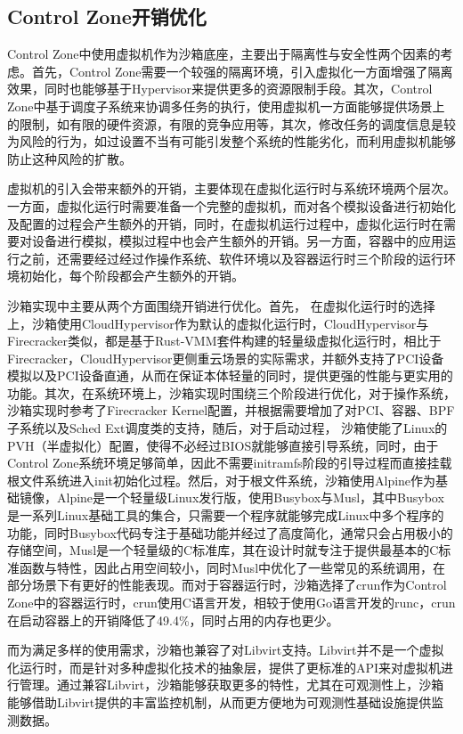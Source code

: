 \subsection{Control Zone开销优化}

Control Zone中使用虚拟机作为沙箱底座，主要出于隔离性与安全性两个因素的考虑。首先，Control Zone需要一个较强的隔离环境，引入虚拟化一方面增强了隔离效果，同时也能够基于Hypervisor来提供更多的资源限制手段。其次，Control Zone中基于调度子系统来协调多任务的执行，使用虚拟机一方面能够提供场景上的限制，如有限的硬件资源，有限的竞争应用等，其次，修改任务的调度信息是较为风险的行为，如过设置不当有可能引发整个系统的性能劣化，而利用虚拟机能够防止这种风险的扩散。

虚拟机的引入会带来额外的开销，主要体现在虚拟化运行时与系统环境两个层次。一方面，虚拟化运行时需要准备一个完整的虚拟机，而对各个模拟设备进行初始化及配置的过程会产生额外的开销，同时，在虚拟机运行过程中，虚拟化运行时在需要对设备进行模拟，模拟过程中也会产生额外的开销。另一方面，容器中的应用运行之前，还需要经过经过作操作系统、软件环境以及容器运行时三个阶段的运行环境初始化，每个阶段都会产生额外的开销。

沙箱实现中主要从两个方面围绕开销进行优化。首先， 在虚拟化运行时的选择上，沙箱使用CloudHypervisor作为默认的虚拟化运行时，CloudHypervisor与Firecracker类似，都是基于Rust-VMM套件构建的轻量级虚拟化运行时，相比于Firecracker，CloudHypervisor更侧重云场景的实际需求，并额外支持了PCI设备模拟以及PCI设备直通，从而在保证本体轻量的同时，提供更强的性能与更实用的功能\citep{agache2020firecracker}。其次，在系统环境上，沙箱实现时围绕三个阶段进行优化，对于操作系统，沙箱实现时参考了Firecracker Kernel配置，并根据需要增加了对PCI、容器、BPF子系统以及Sched Ext调度类的支持，随后，对于启动过程， 沙箱使能了Linux的PVH（半虚拟化）配置，使得不必经过BIOS就能够直接引导系统，同时，由于Control Zone系统环境足够简单，因此不需要initramfs阶段的引导过程而直接挂载根文件系统进入init初始化过程。然后，对于根文件系统，沙箱使用Alpine\citep{alpine}作为基础镜像，Alpine是一个轻量级Linux发行版，使用Busybox与Musl，其中Busybox是一系列Linux基础工具的集合，只需要一个程序就能够完成Linux中多个程序的功能，同时Busybox代码专注于基础功能并经过了高度简化，通常只会占用极小的存储空间，Musl是一个轻量级的C标准库，其在设计时就专注于提供最基本的C标准函数与特性，因此占用空间较小，同时Musl中优化了一些常见的系统调用，在部分场景下有更好的性能表现。而对于容器运行时，沙箱选择了crun\citep{crun}作为Control Zone中的容器运行时，crun使用C语言开发，相较于使用Go语言开发的runc，crun在启动容器上的开销降低了49.4\%，同时占用的内存也更少。

而为满足多样的使用需求，沙箱也兼容了对Libvirt支持。Libvirt并不是一个虚拟化运行时，而是针对多种虚拟化技术的抽象层，提供了更标准的API来对虚拟机进行管理。通过兼容Libvirt，沙箱能够获取更多的特性，尤其在可观测性上，沙箱能够借助Libvirt提供的丰富监控机制，从而更方便地为可观测性基础设施提供监测数据。

